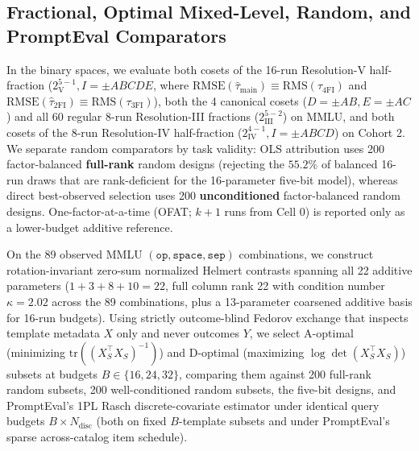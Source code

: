 \documentclass[11pt,a4paper]{article}
\begin{document}
\subsection{Fractional, Optimal Mixed-Level, Random, and PromptEval Comparators}
In the binary spaces, we evaluate both cosets of the 16-run Resolution-V half-fraction ($2^{5-1}_{\mathrm{V}}, I = \pm ABCDE$, where $\mathrm{RMSE}(\hat{\tau}_{\mathrm{main}}) \equiv \mathrm{RMS}(\tau_{\mathrm{4FI}})$ and $\mathrm{RMSE}(\hat{\tau}_{\mathrm{2FI}}) \equiv \mathrm{RMS}(\tau_{\mathrm{3FI}})$), both the 4 canonical cosets ($D=\pm AB, E=\pm AC$) and all 60 regular 8-run Resolution-III fractions ($2^{5-2}_{\mathrm{III}}$) on MMLU, and both cosets of the 8-run Resolution-IV half-fraction ($2^{4-1}_{\mathrm{IV}}, I = \pm ABCD$) on Cohort 2. We separate random comparators by task validity: OLS attribution uses 200 factor-balanced \textbf{full-rank} random designs (rejecting the $55.2\%$ of balanced 16-run draws that are rank-deficient for the 16-parameter five-bit model), whereas direct best-observed selection uses 200 \textbf{unconditioned} factor-balanced random designs. One-factor-at-a-time (OFAT; $k+1$ runs from Cell 0) is reported only as a lower-budget additive reference.

On the 89 observed MMLU $(\texttt{op}, \texttt{space}, \texttt{sep})$ combinations, we construct rotation-invariant zero-sum normalized Helmert contrasts spanning all 22 additive parameters ($1 + 3 + 8 + 10 = 22$, full column rank 22 with condition number $\kappa = 2.02$ across the 89 combinations, plus a 13-parameter coarsened additive basis for 16-run budgets). Using strictly outcome-blind Fedorov exchange \citep{fedorov1972theory,atkinson2007optimum} that inspects template metadata $X$ only and never outcomes $Y$, we select A-optimal (minimizing $\mathrm{tr}((X_S^\top X_S)^{-1})$) and D-optimal (maximizing $\log\det(X_S^\top X_S)$) subsets at budgets $B \in \{16, 24, 32\}$, comparing them against 200 full-rank random subsets, 200 well-conditioned random subsets, the five-bit designs, and PromptEval's 1PL Rasch discrete-covariate estimator \citep{polo2024efficient} under identical query budgets $B \times N_{\mathrm{disc}}$ (both on fixed $B$-template subsets and under PromptEval's sparse across-catalog item schedule).
\end{document}
